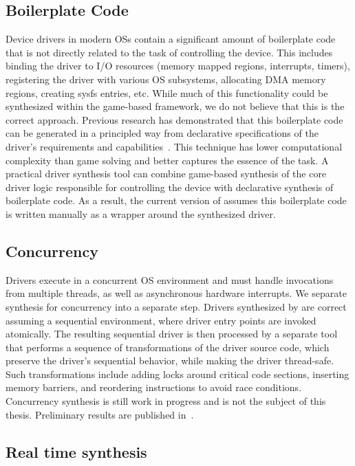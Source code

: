 \subsection{Boilerplate Code}

Device drivers in modern OSs contain a significant amount of boilerplate code that is not directly related to the task of controlling the device.  This includes binding the driver to I/O resources (memory mapped regions, interrupts, timers), registering the driver with various OS subsystems, allocating DMA memory regions, creating sysfs entries, etc.  While much of this functionality could be synthesized within the game-based framework, we do not believe that this is the correct approach.  Previous research has demonstrated that this boilerplate code can be generated in a principled way from declarative specifications of the driver's requirements and capabilities~\cite{Spear_RHHL_06}.  This technique has lower computational complexity than game solving and better captures the essence of the task.  A practical driver synthesis tool can combine game-based synthesis of the core driver logic responsible for controlling the device with declarative synthesis of boilerplate code.  As a result, the current version of \termite assumes this boilerplate code is written manually as a wrapper around the synthesized driver.

\subsection{Concurrency}

Drivers execute in a concurrent OS environment and must handle invocations from multiple threads, as well as asynchronous hardware interrupts.  We separate synthesis for concurrency into a separate step.  Drivers synthesized by \termite are correct assuming a sequential environment, where driver entry points are invoked atomically.  The resulting sequential driver is then processed by a separate tool that performs a sequence of transformations of the driver source code, which preserve the driver's sequential behavior, while making the driver thread-safe.  Such transformations include adding locks around critical code sections, inserting memory barriers, and reordering instructions to avoid race conditions.  Concurrency synthesis is still work in progress and is not the subject of this thesis.  Preliminary results are published in~\cite{Cerny_HRRT_13, Cerny_HRRT_14}.

\subsection{Real time synthesis}

